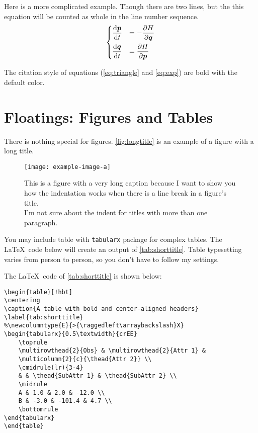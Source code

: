 \documentclass[12pt]{trbart}
\begin{document}
Here is a more complicated example. Though there are two lines, but the this equation will be counted as whole in the line number sequence.
\begin{equation}\label{eq:exp}
\begin{dcases}
    \frac{\mathop{}\negthinspace\mathrm{d} \boldsymbol{p}}{\mathop{}\negthinspace\mathrm{d} t} &= -\frac{\partial H}{\partial \boldsymbol{q}} \\
    \frac{\mathop{}\negthinspace\mathrm{d} \boldsymbol{q}}{\mathop{}\negthinspace\mathrm{d} t} &= \frac{\partial H}{\partial \boldsymbol{p}}
\end{dcases} 
\end{equation}

The citation style of equations (\autoref{eq:triangle} and \autoref{eq:exp}) are bold with the default color.

\section{Floatings: Figures and Tables}
There is nothing special for figures. \autoref{fig:longtitle} is an example of a figure with a long title.
\begin{figure}[!hbt]
    \centering
    \texttt{[image: example-image-a]}
    \caption{This is a figure with a very long caption because I want to show you how the indentation works when there is a line break in a figure's title.\\ I'm not sure about the indent for titles with more than one paragraph.}\label{fig:longtitle}
\end{figure}

You may include table with \texttt{tabularx} package for complex tables. The \LaTeX\ code below will create an output of \autoref{tab:shorttitle}. Table typesetting varies from person to person, so you don't have to follow my settings.

The \LaTeX\ code of \autoref{tab:shorttitle} is shown below:
\begin{verbatim}
\begin{table}[!hbt]
\centering
\caption{A table with bold and center-aligned headers}
\label{tab:shorttitle}
%\newcolumntype{E}{>{\raggedleft\arraybackslash}X}
\begin{tabularx}{0.5\textwidth}{crEE}
    \toprule
    \multirowthead{2}{Obs} & \multirowthead{2}{Attr 1} &
    \multicolumn{2}{c}{\thead{Attr 2}} \\
    \cmidrule(lr){3-4}
    & & \thead{SubAttr 1} & \thead{SubAttr 2} \\
    \midrule
    A & 1.0 & 2.0 & -12.0 \\
    B & -3.0 & -101.4 & 4.7 \\
    \bottomrule
\end{tabularx}
\end{table}   
\end{verbatim}
\end{document}
